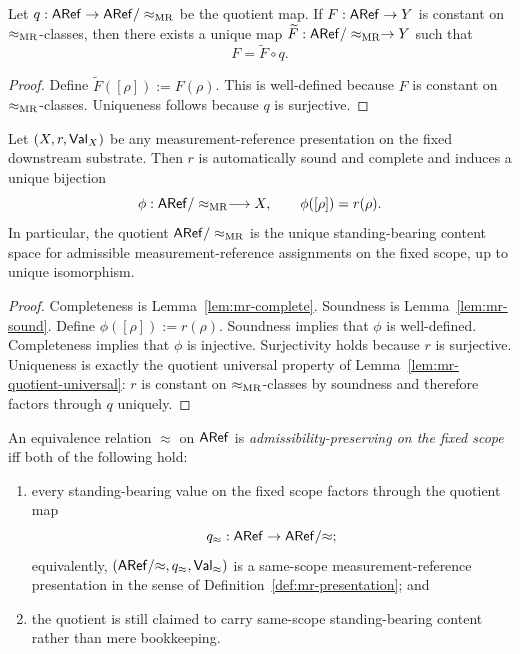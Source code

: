 \begin{lemma}
\label{lem:mr-quotient-universal}
Let $q:\mathsf{ARef}\to\mathsf{ARef}/\mathrel{\approx_{\mathrm{MR}}}$ be the quotient map. If $F:\mathsf{ARef}\to Y$ is constant on $\mathrel{\approx_{\mathrm{MR}}}$-classes,
then there exists a unique map $\widetilde F:\mathsf{ARef}/\mathrel{\approx_{\mathrm{MR}}}\to Y$ such that
\[
F=\widetilde F\circ q.
\]
\end{lemma}

\begin{proof}
Define $\widetilde F([\rho]) := F(\rho)$. This is well-defined because $F$ is constant on
$\mathrel{\approx_{\mathrm{MR}}}$-classes. Uniqueness follows because $q$ is surjective.
\end{proof}

\begin{theorem}
\label{thm:measurement-reference-quotient}
Let $(X,r,\mathsf{Val}_X)$ be any measurement-reference presentation on the fixed downstream substrate.
Then $r$ is automatically sound and complete and induces a unique bijection
\[
\phi:\mathsf{ARef}/\mathrel{\approx_{\mathrm{MR}}} \longrightarrow X,
\qquad
\phi([\rho])=r(\rho).
\]
In particular, the quotient $\mathsf{ARef}/\mathrel{\approx_{\mathrm{MR}}}$ is the unique standing-bearing content space for admissible
measurement-reference assignments on the fixed scope, up to unique isomorphism.
\end{theorem}

\begin{proof}
Completeness is Lemma~\ref{lem:mr-complete}. Soundness is Lemma~\ref{lem:mr-sound}. Define
$\phi([\rho]) := r(\rho)$. Soundness implies that $\phi$ is well-defined. Completeness implies that
$\phi$ is injective. Surjectivity holds because $r$ is surjective. Uniqueness is exactly the quotient
universal property of Lemma~\ref{lem:mr-quotient-universal}: $r$ is constant on $\mathrel{\approx_{\mathrm{MR}}}$-classes by
soundness and therefore factors through $q$ uniquely.
\end{proof}

\begin{definition}
\label{def:admissibility-preserving-quotient}
An equivalence relation $\approx$ on $\mathsf{ARef}$ is \emph{admissibility-preserving on the fixed scope} iff
both of the following hold:
\begin{enumerate}
    \item every standing-bearing value on the fixed scope factors through the quotient map
    \[
    q_{\approx}:\mathsf{ARef}\to \mathsf{ARef}/{\approx};
    \]
    equivalently, $(\mathsf{ARef}/{\approx},q_{\approx},\mathsf{Val}_{\approx})$ is a same-scope measurement-reference
    presentation in the sense of Definition~\ref{def:mr-presentation}; and
    \item the quotient is still claimed to carry same-scope standing-bearing content rather than mere
    bookkeeping.
\end{enumerate}
\end{definition}

